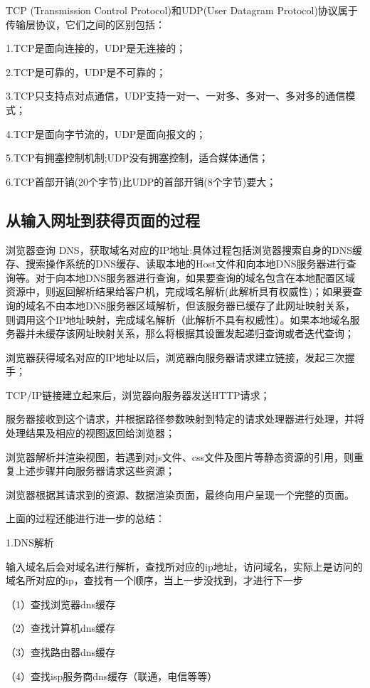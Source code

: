 \documentclass[UTF8]{ctexart}
\begin{document}
TCP (Transmission Control Protocol)和UDP(User Datagram Protocol)协议属于传输层协议，它们之间的区别包括：

1.TCP是面向连接的，UDP是无连接的；

2.TCP是可靠的，UDP是不可靠的；

3.TCP只支持点对点通信，UDP支持一对一、一对多、多对一、多对多的通信模式；

4.TCP是面向字节流的，UDP是面向报文的；

5.TCP有拥塞控制机制;UDP没有拥塞控制，适合媒体通信；

6.TCP首部开销(20个字节)比UDP的首部开销(8个字节)要大；

\subsection{从输入网址到获得页面的过程}

浏览器查询 DNS，获取域名对应的IP地址:具体过程包括浏览器搜索自身的DNS缓存、搜索操作系统的DNS缓存、读取本地的Host文件和向本地DNS服务器进行查询等。对于向本地DNS服务器进行查询，如果要查询的域名包含在本地配置区域资源中，则返回解析结果给客户机，完成域名解析(此解析具有权威性)；如果要查询的域名不由本地DNS服务器区域解析，但该服务器已缓存了此网址映射关系，则调用这个IP地址映射，完成域名解析（此解析不具有权威性）。如果本地域名服务器并未缓存该网址映射关系，那么将根据其设置发起递归查询或者迭代查询；

浏览器获得域名对应的IP地址以后，浏览器向服务器请求建立链接，发起三次握手；

TCP/IP链接建立起来后，浏览器向服务器发送HTTP请求；

服务器接收到这个请求，并根据路径参数映射到特定的请求处理器进行处理，并将处理结果及相应的视图返回给浏览器；

浏览器解析并渲染视图，若遇到对js文件、css文件及图片等静态资源的引用，则重复上述步骤并向服务器请求这些资源；

浏览器根据其请求到的资源、数据渲染页面，最终向用户呈现一个完整的页面。

上面的过程还能进行进一步的总结：

1.DNS解析

输入域名后会对域名进行解析，查找所对应的ip地址，访问域名，实际上是访问的域名所对应的ip，查找有一个顺序，当上一步没找到，才进行下一步 

（1）查找浏览器dns缓存 

（2）查找计算机dns缓存 

（3）查找路由器dns缓存 

（4）查找isp服务商dns缓存（联通，电信等等） 
\end{document}
